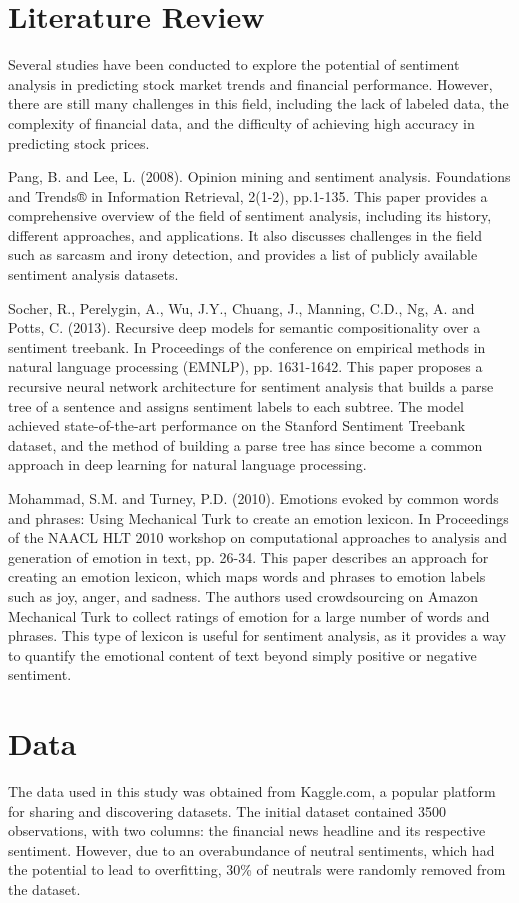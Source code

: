 \documentclass{article}
\begin{document}
\section{Literature Review}

Several studies have been conducted to explore the potential of sentiment analysis in predicting stock market trends and financial performance. However, there are still many challenges in this field, including the lack of labeled data, the complexity of financial data, and the difficulty of achieving high accuracy in predicting stock prices.

Pang, B. and Lee, L. (2008). Opinion mining and sentiment analysis. Foundations and Trends® in Information Retrieval, 2(1-2), pp.1-135.
This paper provides a comprehensive overview of the field of sentiment analysis, including its history, different approaches, and applications. It also discusses challenges in the field such as sarcasm and irony detection, and provides a list of publicly available sentiment analysis datasets.

Socher, R., Perelygin, A., Wu, J.Y., Chuang, J., Manning, C.D., Ng, A. and Potts, C. (2013). Recursive deep models for semantic compositionality over a sentiment treebank. In Proceedings of the conference on empirical methods in natural language processing (EMNLP), pp. 1631-1642. This paper proposes a recursive neural network architecture for sentiment analysis that builds a parse tree of a sentence and assigns sentiment labels to each subtree. The model achieved state-of-the-art performance on the Stanford Sentiment Treebank dataset, and the method of building a parse tree has since become a common approach in deep learning for natural language processing.

Mohammad, S.M. and Turney, P.D. (2010). Emotions evoked by common words and phrases: Using Mechanical Turk to create an emotion lexicon. In Proceedings of the NAACL HLT 2010 workshop on computational approaches to analysis and generation of emotion in text, pp. 26-34. This paper describes an approach for creating an emotion lexicon, which maps words and phrases to emotion labels such as joy, anger, and sadness. The authors used crowdsourcing on Amazon Mechanical Turk to collect ratings of emotion for a large number of words and phrases. This type of lexicon is useful for sentiment analysis, as it provides a way to quantify the emotional content of text beyond simply positive or negative sentiment.

\section{Data}
The data used in this study was obtained from Kaggle.com, a popular platform for sharing and discovering datasets. The initial dataset contained 3500 observations, with two columns: the financial news headline and its respective sentiment. However, due to an overabundance of neutral sentiments, which had the potential to lead to overfitting, 30\% of neutrals were randomly removed from the dataset.
\end{document}
